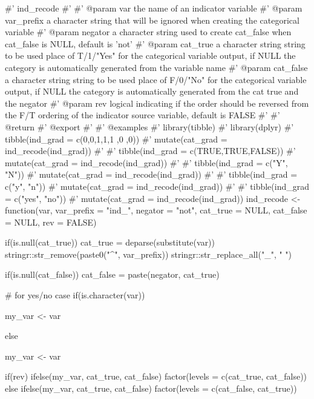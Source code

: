 \begin{Schunk}
\begin{Sinput}
#' ind_recode
#'
#' @param var the name of an indicator variable
#' @param var_prefix a character string that will be ignored when creating the categorical variable
#' @param negator a character string used to create cat_false when cat_false is NULL, default is 'not'
#' @param cat_true a character string string to be used place of  T/1/"Yes" for the categorical variable output, if NULL the category is automatically generated from the variable name
#' @param cat_false a character string string to be used place of  F/0/"No" for the categorical variable output, if NULL the category is automatically generated from the cat true and the negator
#' @param rev logical indicating if the order should be reversed from the F/T ordering of the indicator source variable, default is FALSE
#'
#' @return
#' @export
#'
#' @examples
#' library(tibble)
#' library(dplyr)
#' tibble(ind_grad = c(0,0,1,1,1 ,0 ,0)) %
#'   mutate(cat_grad  = ind_recode(ind_grad))
#'
#' tibble(ind_grad = c(TRUE,TRUE,FALSE)) %
#'   mutate(cat_grad  = ind_recode(ind_grad))
#'
#' tibble(ind_grad = c("Y", "N")) %
#'   mutate(cat_grad  = ind_recode(ind_grad))
#'
#' tibble(ind_grad = c("y", "n")) %
#'   mutate(cat_grad  = ind_recode(ind_grad))
#'
#' tibble(ind_grad = c("yes", "no")) %
#'   mutate(cat_grad  = ind_recode(ind_grad))
ind_recode <- function(var, var_prefix = "ind_", negator = "not",
                       cat_true = NULL, cat_false = NULL, rev = FALSE){

  if(is.null(cat_true)){
    cat_true = deparse(substitute(var)) %
      stringr::str_remove(paste0("^", var_prefix)) %
      stringr::str_replace_all("_", " ")
  }

  if(is.null(cat_false)){
    cat_false = paste(negator, cat_true)
  }

  # for yes/no case
  if(is.character({{var}})){

    my_var <- {{var}} %

  }else{

    my_var <- {{var}}
  }

  if(rev){
    ifelse(my_var, cat_true, cat_false) %
      factor(levels = c(cat_true, cat_false))
  }else{
    ifelse(my_var, cat_true, cat_false) %
      factor(levels = c(cat_false, cat_true))
  }


}
\end{Sinput}
\end{Schunk}

